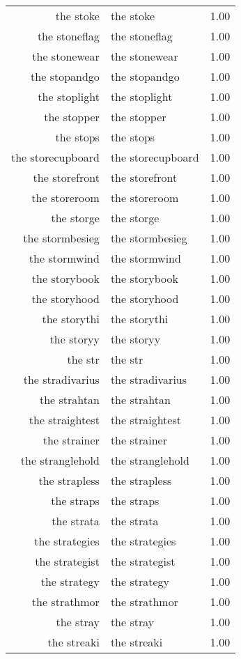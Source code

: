 \begin{table}[ht]
\begin{tabular}{rlr}
  the stoke & the stoke & 1.00 \\ 
  the stoneflag & the stoneflag & 1.00 \\ 
  the stonewear & the stonewear & 1.00 \\ 
  the stopandgo & the stopandgo & 1.00 \\ 
  the stoplight & the stoplight & 1.00 \\ 
  the stopper & the stopper & 1.00 \\ 
  the stops & the stops & 1.00 \\ 
  the storecupboard & the storecupboard & 1.00 \\ 
  the storefront & the storefront & 1.00 \\ 
  the storeroom & the storeroom & 1.00 \\ 
  the storge & the storge & 1.00 \\ 
  the stormbesieg & the stormbesieg & 1.00 \\ 
  the stormwind & the stormwind & 1.00 \\ 
  the storybook & the storybook & 1.00 \\ 
  the storyhood & the storyhood & 1.00 \\ 
  the storythi & the storythi & 1.00 \\ 
  the storyy & the storyy & 1.00 \\ 
  the str & the str & 1.00 \\ 
  the stradivarius & the stradivarius & 1.00 \\ 
  the strahtan & the strahtan & 1.00 \\ 
  the straightest & the straightest & 1.00 \\ 
  the strainer & the strainer & 1.00 \\ 
  the stranglehold & the stranglehold & 1.00 \\ 
  the strapless & the strapless & 1.00 \\ 
  the straps & the straps & 1.00 \\ 
  the strata & the strata & 1.00 \\ 
  the strategies & the strategies & 1.00 \\ 
  the strategist & the strategist & 1.00 \\ 
  the strategy & the strategy & 1.00 \\ 
  the strathmor & the strathmor & 1.00 \\ 
  the stray & the stray & 1.00 \\ 
  the streaki & the streaki & 1.00 \\ 

\end{tabular}
\end{table}
